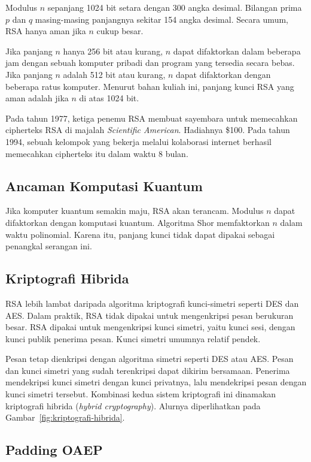 Modulus $n$ sepanjang 1024 bit setara dengan 300 angka desimal. Bilangan prima
$p$ dan $q$ masing-masing panjangnya sekitar 154 angka desimal. Secara umum,
RSA hanya aman jika $n$ cukup besar.

Jika panjang $n$ hanya 256 bit atau kurang, $n$ dapat difaktorkan dalam
beberapa jam dengan sebuah komputer pribadi dan program yang tersedia secara
bebas. Jika panjang $n$ adalah 512 bit atau kurang, $n$ dapat difaktorkan
dengan beberapa ratus komputer. Menurut bahan kuliah ini, panjang kunci RSA
yang aman adalah jika $n$ di atas 1024 bit.

Pada tahun 1977, ketiga penemu RSA membuat sayembara untuk memecahkan
cipherteks RSA di majalah \textit{Scientific American}. Hadiahnya \$100.
Pada tahun 1994, sebuah kelompok yang bekerja melalui kolaborasi internet
berhasil memecahkan cipherteks itu dalam waktu 8 bulan.

\subsection{Ancaman Komputasi Kuantum}

Jika komputer kuantum semakin maju, RSA akan terancam. Modulus $n$ dapat
difaktorkan dengan komputasi kuantum. Algoritma Shor memfaktorkan $n$ dalam
waktu polinomial. Karena itu, panjang kunci tidak dapat dipakai sebagai
penangkal serangan ini.

\subsection{Kriptografi Hibrida}

RSA lebih lambat daripada algoritma kriptografi kunci-simetri seperti DES dan
AES. Dalam praktik, RSA tidak dipakai untuk mengenkripsi pesan berukuran
besar. RSA dipakai untuk mengenkripsi kunci simetri, yaitu kunci sesi, dengan
kunci publik penerima pesan. Kunci simetri umumnya relatif pendek.

Pesan tetap dienkripsi dengan algoritma simetri seperti DES atau AES. Pesan
dan kunci simetri yang sudah terenkripsi dapat dikirim bersamaan. Penerima
mendekripsi kunci simetri dengan kunci privatnya, lalu mendekripsi pesan dengan
kunci simetri tersebut. Kombinasi kedua sistem kriptografi ini dinamakan
kriptografi hibrida (\textit{hybrid cryptography}). Alurnya diperlihatkan pada
Gambar~\ref{fig:kriptografi-hibrida}.



\subsection{Padding OAEP}
\label{subsec:padding-oaep}

